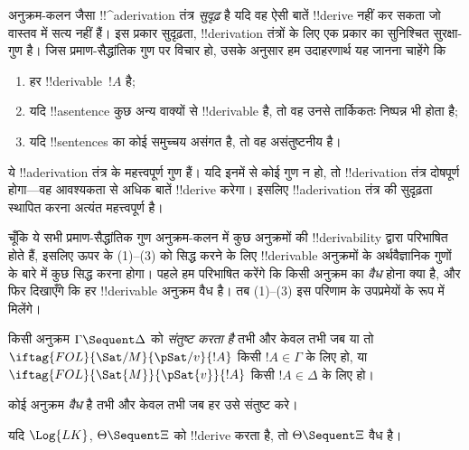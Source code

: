 \documentclass[../../../include/open-logic-section]{subfiles}
\begin{document}
      {}
      {}


\begin{explain}
अनुक्रम-कलन जैसा !!^a{derivation} तंत्र \emph{सुदृढ़} है यदि वह ऐसी बातें
!!{derive} नहीं कर सकता जो वास्तव में सत्य नहीं हैं। इस प्रकार सुदृढ़ता,
!!{derivation} तंत्रों के लिए एक प्रकार का सुनिश्चित सुरक्षा-गुण है। जिस
प्रमाण-सैद्धांतिक गुण पर विचार हो, उसके अनुसार हम उदाहरणार्थ यह जानना चाहेंगे कि
\begin{enumerate}
\item हर !!{derivable}~$!A$  है;
\item यदि !!a{sentence} कुछ अन्य वाक्यों से !!{derivable} है, तो वह उनसे
  तार्किकतः निष्पन्न भी होता है;
\item यदि !!{sentence}s का कोई समुच्चय असंगत है, तो वह असंतुष्टनीय है।
\end{enumerate}
ये !!a{derivation} तंत्र के महत्त्वपूर्ण गुण हैं। यदि इनमें से कोई गुण न हो,
तो !!{derivation} तंत्र दोषपूर्ण होगा---वह आवश्यकता से अधिक बातें !!{derive}
करेगा। इसलिए !!a{derivation} तंत्र की सुदृढ़ता स्थापित करना अत्यंत महत्त्वपूर्ण है।

चूँकि ये सभी प्रमाण-सैद्धांतिक गुण अनुक्रम-कलन में कुछ अनुक्रमों की
!!{derivability} द्वारा परिभाषित होते हैं, इसलिए ऊपर के (1)--(3) को सिद्ध करने
के लिए !!{derivable} अनुक्रमों के अर्थवैज्ञानिक गुणों के बारे में कुछ सिद्ध
करना होगा। पहले हम परिभाषित करेंगे कि किसी अनुक्रम का \emph{वैध} होना क्या है,
और फिर दिखाएँगे कि हर !!{derivable} अनुक्रम वैध है। तब (1)--(3) इस परिणाम के
उपप्रमेयों के रूप में मिलेंगे।
\end{explain}

\begin{defn}
 किसी अनुक्रम
$\Gamma \Sequent \Delta$ को \emph{संतुष्ट करता है} तभी और केवल तभी जब या तो
$\iftag{FOL}{\Sat/{M}}{\pSat/{v}}{!A}$ किसी $!A \in \Gamma$ के लिए हो, या
$\iftag{FOL}{\Sat{M}}{\pSat{v}}{!A}$ किसी $!A \in \Delta$ के लिए हो।

कोई अनुक्रम \emph{वैध} है तभी और केवल तभी जब हर
 उसे
संतुष्ट करे।
\end{defn}

\begin{thm}[सुदृढ़ता]
 यदि $\Log{LK}$, $\Theta
\Sequent \Xi$ को !!{derive} करता है, तो $\Theta \Sequent \Xi$ वैध है।
\end{thm}
\end{document}
